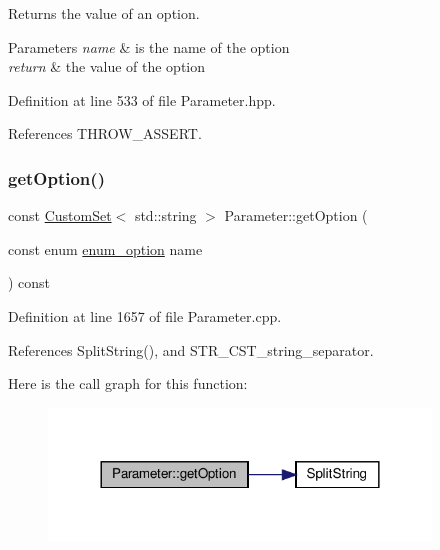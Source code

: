 Returns the value of an option. 


\begin{DoxyParams}{Parameters}
{\em name} & is the name of the option \\
\hline
{\em return} & the value of the option \\
\hline
\end{DoxyParams}


Definition at line 533 of file Parameter.\+hpp.



References T\+H\+R\+O\+W\+\_\+\+A\+S\+S\+E\+RT.

\mbox{\label{classParameter_a259a37f0403a54017ca131395a40e2d2}} 
\subsubsection{\texorpdfstring{get\+Option()}{getOption()}\hspace{0.1cm}{\footnotesize\ttfamily [6/8]}}
{\footnotesize\ttfamily const \hyperlink{custom__set_8hpp_a615bc2f42fc38a4bb1790d12c759e86f}{Custom\+Set}$<$ std\+::string $>$ Parameter\+::get\+Option (\begin{DoxyParamCaption}\item[{const enum \hyperlink{Parameter_8hpp_a6d9441db52e537f5588658b218875976}{enum\+\_\+option}}]{name }\end{DoxyParamCaption}) const}



Definition at line 1657 of file Parameter.\+cpp.



References Split\+String(), and S\+T\+R\+\_\+\+C\+S\+T\+\_\+string\+\_\+separator.

Here is the call graph for this function\+:
\nopagebreak
\begin{figure}[H]
\begin{center}
\leavevmode
\includegraphics[width=288pt]{dc/dab/classParameter_a259a37f0403a54017ca131395a40e2d2_cgraph}
\end{center}
\end{figure}
\mbox{\label{classParameter_a1bcc58ccd8eab01e839ad9bb7ae68787}} 
